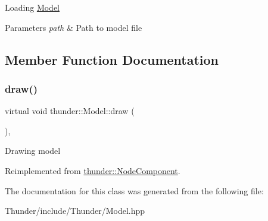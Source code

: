 Loading \mbox{\hyperlink{classthunder_1_1_model}{Model}} 
\begin{DoxyParams}{Parameters}
{\em path} & Path to model file \\
\hline
\end{DoxyParams}


\subsection{Member Function Documentation}
\mbox{\label{classthunder_1_1_model_ab85c39eee0286fb332250b46c8315c76}} 
\subsubsection{\texorpdfstring{draw()}{draw()}}
{\footnotesize\ttfamily virtual void thunder\+::\+Model\+::draw (\begin{DoxyParamCaption}{ }\end{DoxyParamCaption})\hspace{0.3cm}{\ttfamily [override]}, {\ttfamily [virtual]}}

Drawing model 

Reimplemented from \mbox{\hyperlink{classthunder_1_1_node_component_a1edbd50e6595a2ad181d14683c98f405}{thunder\+::\+Node\+Component}}.



The documentation for this class was generated from the following file\+:\begin{DoxyCompactItemize}
\item 
Thunder/include/\+Thunder/Model.\+hpp\end{DoxyCompactItemize}
